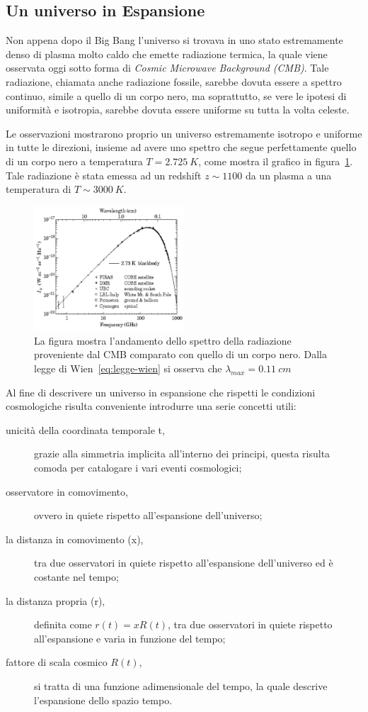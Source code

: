 \subsection{Un universo in Espansione}\label{sec:unverso-espansione}
Non appena dopo il Big Bang l'universo si trovava in uno stato estremamente denso di plasma molto caldo che emette radiazione termica, la quale viene osservata oggi sotto forma di \emph{Cosmic Microwave Background (CMB)}. Tale radiazione, chiamata anche radiazione fossile, sarebbe dovuta essere a spettro continuo, simile a quello di un corpo nero, ma soprattutto, se vere le ipotesi di uniformità e isotropia, sarebbe dovuta essere uniforme su tutta la volta celeste. 

Le osservazioni mostrarono proprio un universo estremamente isotropo e uniforme in tutte le direzioni, insieme ad avere uno spettro che segue perfettamente quello di un corpo nero a temperatura $T = \SI{2.725}{K}$, come mostra il grafico in figura~\ref{fig:balckbody-universe}. Tale radiazione è stata emessa ad un redshift $z \sim 1100$ da un plasma a una temperatura di $T \sim \SI{3000}{K}$.
\begin{figure}
    \centering
    \includegraphics[width = 0.5\textwidth]{immagini/blackbody-universe.png}
    \caption{La figura mostra l'andamento dello spettro della radiazione proveniente dal CMB comparato con quello di un corpo nero. Dalla legge di Wien~\eqref{eq:legge-wien} si osserva che $\lambda_{max}= \SI{0.11}{cm}$}\label{fig:balckbody-universe}
\end{figure}

Al fine di descrivere un universo in espansione che rispetti le condizioni cosmologiche risulta conveniente introdurre una serie concetti utili:
\begin{description}
    \item[unicità della coordinata temporale t,] grazie alla simmetria implicita all'interno dei principi, questa risulta comoda per catalogare i vari eventi cosmologici;
    \item[osservatore in comovimento,] ovvero in quiete rispetto all'espansione dell'universo;
    \item[la distanza in comovimento (x),] tra due osservatori in quiete rispetto all'espansione dell'universo ed è costante nel tempo;
    \item[la distanza propria (r),] definita come $r(t) = x R(t)$, tra due osservatori in quiete rispetto all'espansione e varia in funzione del tempo;
    \item[fattore di scala cosmico $R(t)$,] si tratta di una funzione adimensionale del tempo, la quale descrive l'espansione dello spazio tempo.
\end{description}

